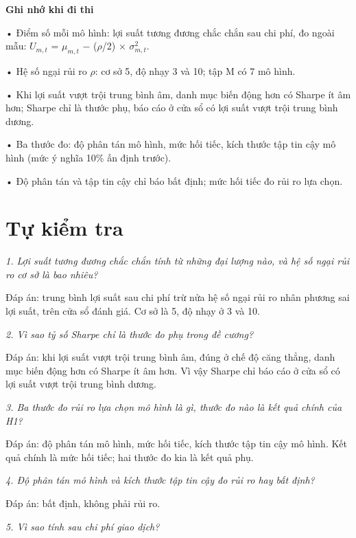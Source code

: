 \begin{tcolorbox}[breakable]
\textbf{Ghi nhớ khi đi thi}

• Điểm số mỗi mô hình: lợi suất tương đương chắc chắn sau chi phí, đo ngoài mẫu: \(U_{m,t}\) = \(\mu_{m,t}\) − (\(\rho\)/2) × \(\sigma_{m,t}^{2}\).

• Hệ số ngại rủi ro \(\rho\): cơ sở 5, độ nhạy 3 và 10; tập M có 7 mô hình.

• Khi lợi suất vượt trội trung bình âm, danh mục biến động hơn có Sharpe ít âm hơn; Sharpe chỉ là thước phụ, báo cáo ở cửa sổ có lợi suất vượt trội trung bình dương.

• Ba thước đo: độ phân tán mô hình, mức hối tiếc, kích thước tập tin cậy mô hình (mức ý nghĩa 10\% ấn định trước).

• Độ phân tán và tập tin cậy chỉ báo bất định; mức hối tiếc đo rủi ro lựa chọn.
\end{tcolorbox}

\section{Tự kiểm tra}

{\itshape 1. Lợi suất tương đương chắc chắn tính từ những đại lượng nào, và hệ số ngại rủi ro cơ sở là bao nhiêu?\par}

Đáp án: trung bình lợi suất sau chi phí trừ nửa hệ số ngại rủi ro nhân phương sai lợi suất, trên cửa sổ đánh giá. Cơ sở là 5, độ nhạy ở 3 và 10.

{\itshape 2. Vì sao tỷ số Sharpe chỉ là thước đo phụ trong đề cương?\par}

Đáp án: khi lợi suất vượt trội trung bình âm, đúng ở chế độ căng thẳng, danh mục biến động hơn có Sharpe ít âm hơn. Vì vậy Sharpe chỉ báo cáo ở cửa sổ có lợi suất vượt trội trung bình dương.

{\itshape 3. Ba thước đo rủi ro lựa chọn mô hình là gì, thước đo nào là kết quả chính của H1?\par}

Đáp án: độ phân tán mô hình, mức hối tiếc, kích thước tập tin cậy mô hình. Kết quả chính là mức hối tiếc; hai thước đo kia là kết quả phụ.

{\itshape 4. Độ phân tán mô hình và kích thước tập tin cậy đo rủi ro hay bất định?\par}

Đáp án: bất định, không phải rủi ro.

{\itshape 5. Vì sao tính sau chi phí giao dịch?\par}

